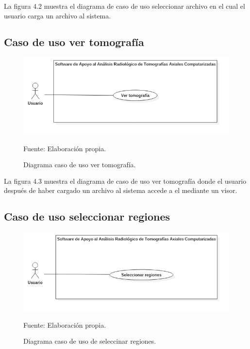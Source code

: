 \documentclass[12pt]{report}
\begin{document}
La figura 4.2 muestra el diagrama de caso de uso seleccionar archivo en el cual el usuario carga un archivo al sistema.

\subsection{Caso de uso ver tomografía}
\begin{figure}[H]
\centering
\includegraphics[width = 9 cm, height =  7 cm]{VerCasos}
\caption{Diagrama caso de uso ver tomografía.}
Fuente: Elaboración propia.
\end{figure}

La figura 4.3 muestra el diagrama de caso de uso ver tomografía donde el usuario después de haber cargado un archivo al sistema accede a el mediante un visor.

\subsection{Caso de uso seleccionar regiones}
\begin{figure}[H]
\centering
\includegraphics[width = 9 cm, height =  7 cm]{RegionCasos}
\caption{Diagrama caso de uso de seleccinar regiones.}
Fuente: Elaboración propia.
\end{figure}
\end{document}
